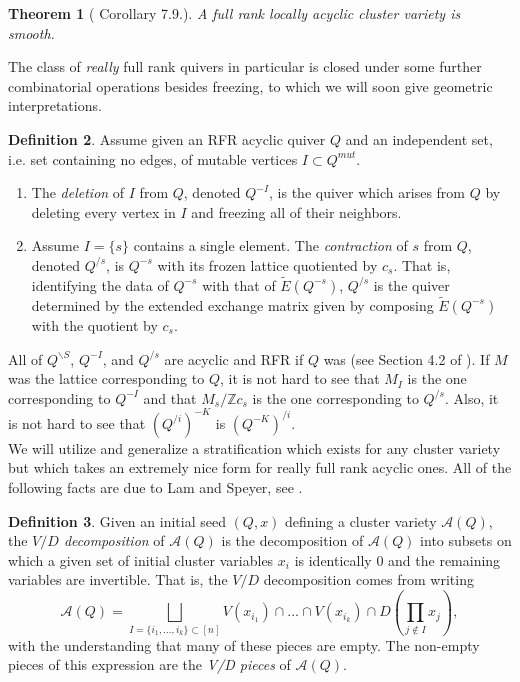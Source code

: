\documentclass[11pt]{amsart}
\newtheorem{thm}{Theorem}[section]
\theoremstyle{definition}
\newtheorem{defn}[thm]{Definition}
\theoremstyle{remark}
\numberwithin{equation}{section}
\begin{document}
\begin{thm}[\cite{Mul} Corollary 7.9.] \label{loc. acyclic smoothness}
    A full rank locally acyclic cluster variety is smooth.
\end{thm}

The class of \textit{really} full rank quivers in particular is closed under some further combinatorial operations besides freezing, to which we will soon give geometric interpretations.

\begin{defn}\label{contraction}
    Assume given an RFR acyclic quiver $Q$ and an independent set, i.e. set containing no edges, of mutable vertices $I \subset Q^{mut}$.

    \begin{enumerate}
        \item The \textit{deletion} of $I$ from $Q$, denoted $Q^{-I}$, is the quiver which arises from $Q$ by deleting every vertex in $I$ and freezing all of their neighbors. 
        \item Assume $I = \{s\}$ contains a single element. The \textit{contraction} of $s$ from $Q$, denoted $Q^{/s}$, is $Q^{-s}$ with its frozen lattice quotiented by $c_s$. That is, identifying the data of $Q^{-s}$ with that of $\tilde{E}(Q^{-s})$, $Q^{/s}$ is the quiver determined by the extended exchange matrix given by composing $\tilde{E}(Q^{-s})$ with the quotient by $c_s$.
    \end{enumerate}
\end{defn}

All of $Q^{\backslash S}$, $Q^{-I}$, and $Q^{/s}$ are acyclic and RFR if $Q$ was (see Section 4.2 of \cite{hlavinka2026chow}). If $M$ was the lattice corresponding to $Q$, it is not hard to see that $M_I$ is the one corresponding to $Q^{-I}$ and that $M_s/\mathbb{Z}c_s$ is the one corresponding to $Q^{/s}$. Also, it is not hard to see that $(Q^{/i})^{-K}$ is $(Q^{-K})^{/i}$.\\

We will utilize and generalize a stratification which exists for any cluster variety but which takes an extremely nice form for really full rank acyclic ones. All of the following facts are due to Lam and Speyer, see \cite{LSII}.

\begin{defn}\label{v/d defn}
    Given an initial seed $(Q, x)$ defining a cluster variety $\mathcal{A}(Q)$, the \textit{$V/D$ decomposition} of $\mathcal{A}(Q)$ is the decomposition of $\mathcal{A}(Q)$ into subsets on which a given set of initial cluster variables $x_i$ is identically $0$ and the remaining variables are invertible. That is, the $V/D$ decomposition comes from writing $$\mathcal{A}(Q) = \bigsqcup_{I = \{i_1, ..., i_k\} \subset [n]} V(x_{i_1})\cap ...\cap V(x_{i_k}) \cap D(\prod_{j \notin I} x_j),$$ \noindent with the understanding that many of these pieces are empty. The non-empty pieces of this expression are the \textit{V/D pieces} of $\mathcal{A}(Q)$.
\end{defn}
\end{document}
